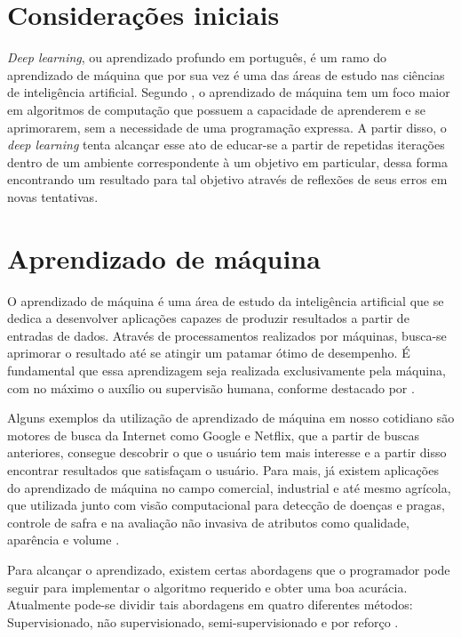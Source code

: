 \section{Considerações iniciais}

\textit{Deep learning}, ou aprendizado profundo em português, é um ramo do aprendizado de máquina que por sua vez é uma das áreas de estudo nas ciências de inteligência artificial. 
Segundo , o aprendizado de máquina tem um foco maior em algoritmos de computação que possuem a capacidade de aprenderem e se aprimorarem, sem a necessidade de uma programação expressa.
A partir disso, o \textit{deep learning} tenta alcançar esse ato de educar-se a partir de repetidas iterações dentro de um ambiente correspondente à um objetivo em particular, dessa forma encontrando um resultado para tal objetivo através de reflexões de seus erros em novas tentativas.

\section{Aprendizado de máquina}

O aprendizado de máquina é uma área de estudo da inteligência artificial que se dedica a desenvolver aplicações capazes de produzir resultados a partir de entradas de dados. 
Através de processamentos realizados por máquinas, busca-se aprimorar o resultado até se atingir um patamar ótimo de desempenho. 
É fundamental que essa aprendizagem seja realizada exclusivamente pela máquina, com no máximo o auxílio ou supervisão humana, conforme destacado por .

Alguns exemplos da utilização de aprendizado de máquina em nosso cotidiano são motores de busca da Internet como Google e Netflix, que a partir de buscas anteriores, consegue descobrir o que o  usuário tem mais interesse e a partir disso encontrar resultados que satisfaçam o usuário.
Para mais, já existem aplicações do aprendizado de máquina no campo comercial, industrial e até mesmo agrícola, que utilizada junto com visão computacional para detecção de doenças e pragas, controle de safra e na avaliação não invasiva de atributos como qualidade, aparência e volume \cite{agrivis2020}.

Para alcançar o aprendizado, existem certas abordagens que o programador pode seguir para implementar o algoritmo requerido e obter uma boa acurácia. 
Atualmente pode-se dividir tais abordagens em quatro diferentes métodos: Supervisionado, não supervisionado, semi-supervisionado e por reforço \cite{Russell2009}.

